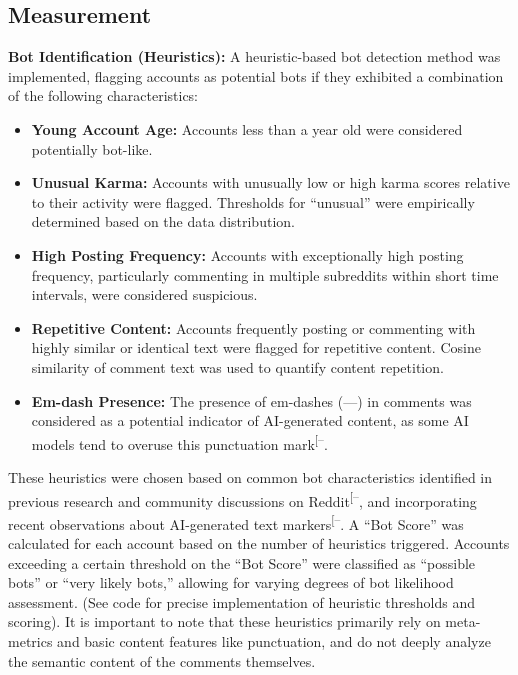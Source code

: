 \documentclass[
  12pt,
  letterpaper,
  DIV=11,
  numbers=noendperiod]{scrartcl}
\providecommand{\tightlist}{%
  \setlength{\itemsep}{0pt}\setlength{\parskip}{0pt}}\usepackage{longtable,booktabs,array}
\begin{document}
\subsection{Measurement}\label{measurement}

\textbf{Bot Identification (Heuristics):} A heuristic-based bot
detection method was implemented, flagging accounts as potential bots if
they exhibited a combination of the following characteristics:

\begin{itemize}
\tightlist
\item
  \textbf{Young Account Age:} Accounts less than a year old were
  considered potentially bot-like.
\item
  \textbf{Unusual Karma:} Accounts with unusually low or high karma
  scores relative to their activity were flagged. Thresholds for
  ``unusual'' were empirically determined based on the data
  distribution.
\item
  \textbf{High Posting Frequency:} Accounts with exceptionally high
  posting frequency, particularly commenting in multiple subreddits
  within short time intervals, were considered suspicious.
\item
  \textbf{Repetitive Content:} Accounts frequently posting or commenting
  with highly similar or identical text were flagged for repetitive
  content. Cosine similarity of comment text was used to quantify
  content repetition.
\item
  \textbf{Em-dash Presence:} The presence of em-dashes (---) in comments
  was considered as a potential indicator of AI-generated content, as
  some AI models tend to overuse this punctuation
  mark\textsuperscript{{[}--\citeproc{ref-nightwateremdash}{14}{]}}.
\end{itemize}

These heuristics were chosen based on common bot characteristics
identified in previous research and community discussions on
Reddit\textsuperscript{{[}--\citeproc{ref-botproblem7daystodie}{17}{]}},
and incorporating recent observations about AI-generated text
markers\textsuperscript{{[}--\citeproc{ref-nightwateremdash}{14}{]}}.
A ``Bot Score'' was calculated for each account based on the number of
heuristics triggered. Accounts exceeding a certain threshold on the
``Bot Score'' were classified as ``possible bots'' or ``very likely
bots,'' allowing for varying degrees of bot likelihood assessment. (See
code for precise implementation of heuristic thresholds and scoring). It
is important to note that these heuristics primarily rely on
meta-metrics and basic content features like punctuation, and do not
deeply analyze the semantic content of the comments themselves.
\end{document}
